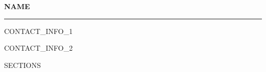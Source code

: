 \documentclass{article}
\newcommand{\name}[1]{
\textbf{{\Large #1}}
\vspace{5pt}
\hrule}
\begin{document}
\name{NAME}

\vspace{10pt}

CONTACT_INFO_1

\vspace{5pt}

CONTACT_INFO_2

\vspace{10pt}

SECTIONS
\end{document}
